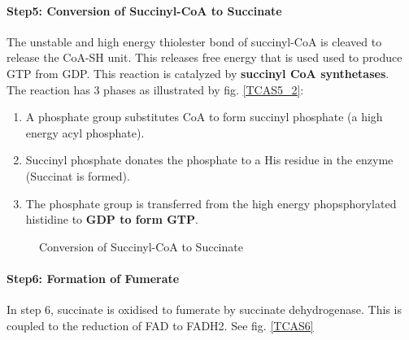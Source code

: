 \documentclass[../main.tex]{subfiles}
\begin{document}
\paragraph{Step5: Conversion of Succinyl-CoA to Succinate}
The unstable and high energy thiolester bond of succinyl-CoA is cleaved to release the CoA-SH unit. This releases free energy that is used used to produce GTP from GDP. This reaction is catalyzed by \textbf{succinyl CoA synthetases}. \\
The reaction has 3 phases as illustrated by fig. \ref{TCAS5_2}:
\begin{enumerate}
	\item A phosphate group substitutes CoA to form succinyl phosphate (a high energy acyl phosphate).
	\item Succinyl phosphate  donates the phosphate to a His residue in the enzyme (Succinat is formed).
	\item The phosphate group is transferred from the high energy phopsphorylated histidine to \textbf{GDP to form GTP}. 
\end{enumerate}
\begin{figure}[H]
	\centering
	\caption{Conversion of Succinyl-CoA to Succinate}
\end{figure}

\paragraph{Step6: Formation of Fumerate}
In step 6, succinate is oxidised to fumerate by succinate dehydrogenase. This is coupled to the reduction of FAD to FADH2. See fig. \ref{TCAS6}
\end{document}
